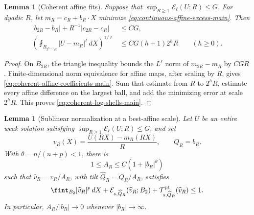 \documentclass[11pt,reqno]{amsart}
\numberwithin{equation}{section}
\newcommand{\dd}{\,d}
\newtheorem{lemma}[theorem]{Lemma}
\theoremstyle{remark}
\begin{document}
\begin{lemma}[Coherent affine fits]
\label{lem:coherent-affine-fits-main}
Suppose that \(\sup_{R\ge1}\mathscr E_\ell(U;R)\le G\).  For dyadic
\(R\), let \(m_R=c_R+b_R\cdot X\) minimize
\eqref{eq:continuous-affine-excess-main}.  Then
\begin{align}
 |b_{2R}-b_R|+R^{-1}|c_{2R}-c_R|&\le CG,
 \label{eq:coherent-affine-coefficients-main}\\
 \left(\fint_{B_{2^{h+1}R}}|U-m_R|^\ell\dd X\right)^{1/\ell}
 &\le CG(h+1)2^hR\qquad(h\ge0).
 \label{eq:coherent-log-shells-main}
\end{align}
\end{lemma}

\begin{proof}
On \(B_{2R}\), the triangle inequality bounds the \(L^\ell\) norm of
\(m_{2R}-m_R\) by \(CGR\).  Finite-dimensional norm equivalence for
affine maps, after scaling by \(R\), gives
\eqref{eq:coherent-affine-coefficients-main}.  Sum that estimate from
\(R\) to \(2^hR\), estimate every affine difference on the largest
ball, and add the minimizing error at scale \(2^hR\).  This proves
\eqref{eq:coherent-log-shells-main}.
\end{proof}

\begin{lemma}[Sublinear normalization at a best-affine scale]
\label{lem:sublinear-best-affine-normalization-main}
Let \(U\) be an entire weak solution satisfying
\(\sup_{R\ge1}\mathscr E_\ell(U;R)\le G\), and set
\[
 v_R(X)=\frac{U(RX)-m_R(RX)}R,\qquad Q_R=b_R.
\]
With \(\theta=n/(n+p)<1\), there is
\begin{equation}
 1\le A_R\le C(1+|b_R|^\theta)
 \label{eq:sublinear-best-affine-amplitude-main}
\end{equation}
such that \(\widehat v_R=v_R/A_R\), with tilt
\(\widehat Q_R=Q_R/A_R\), satisfies
\begin{equation}
 \fint_{B_2}|\widehat v_R|^p\dd X
 +\mathcal E_{s,\widehat Q_R}(\widehat v_R;B_2)
 +\mathcal T^{\rm pt}_{s,\widehat Q_R}(\widehat v_R)\le1.
 \label{eq:sublinear-best-affine-unit-data-main}
\end{equation}
In particular, \(A_R/|b_R|\to0\) whenever \(|b_R|\to\infty\).
\end{lemma}
\end{document}
